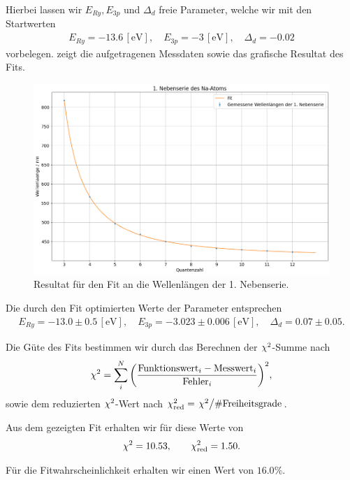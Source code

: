 Hierbei lassen wir $E_{Ry}, E_{3p}$ und $\Delta_d$ freie Parameter, welche wir mit den Startwerten 
\begin{align}
  E_{Ry} = -13.6\, [\si{\electronvolt}], \quad
  E_{3p} = -3\, [\si{\electronvolt}], \quad
  \Delta_d = -0.02
\end{align}
vorbelegen.  zeigt die aufgetragenen Messdaten sowie das grafische Resultat des Fits.

\begin{figure}[H]
  \centering
  \includegraphics[width=.9\textwidth]{files/plots/na_1ns_fit.png}
  \caption{Resultat für den Fit an die Wellenlängen der 1. Nebenserie.}
  \label{fig:na_1ns_fit}
\end{figure}

Die durch den Fit optimierten Werte der Parameter entsprechen
\begin{align}
  E_{Ry} = -13.0 \pm 0.5\, [\si{\electronvolt}], \quad
  E_{3p} = -3.023 \pm 0.006\, [\si{\electronvolt}], \quad
  \Delta_d = 0.07 \pm 0.05.
\end{align}

Die Güte des Fits bestimmen wir durch das Berechnen der $\chi^{2}$-Summe nach
\begin{align}
  \chi^{2} = \sum_{i}^{N} \qty(\frac{\text{Funktionswert}_i - \text{Messwert}_i}{\text{Fehler}_i})^2,
\end{align}
sowie dem reduzierten $\chi^{2}$-Wert nach $\chisqrd = \flatfrac{\chisq}{\#\text{Freiheitsgrade}}$.

Aus dem gezeigten Fit erhalten wir für diese Werte von
\begin{align}
  \chi^{2} = 10.53,\qquad \chi^{2}_{\mathrm{red}} = 1.50.
\end{align}

Für die Fitwahrscheinlichkeit erhalten wir einen Wert von $16.0\%$.

